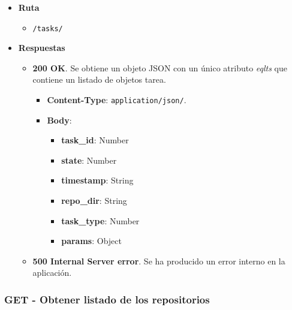 \begin{itemize}
    \item[] \textbf{Ruta}
        \begin{itemize} \setlength\itemsep{0.2em}
            \item[] \texttt{/tasks/}
        \end{itemize}
    \item[] \textbf{Respuestas}
        \begin{itemize} \setlength\itemsep{0.2em}
            \item[] \textbf{200 OK}. Se obtiene un objeto JSON con un único atributo \textit{eqlts} que contiene un listado de objetos tarea.
                \begin{itemize} \setlength\itemsep{0.2em}
                    \item[] \textbf{Content-Type}: \texttt{application/json/}.
                    \item[] \textbf{Body}: 
                        \begin{itemize}
                            \item[] \textbf{task\_id}: Number
                            \item[] \textbf{state}: Number
                            \item[] \textbf{timestamp}: String
                            \item[] \textbf{repo\_dir}: String
                            \item[] \textbf{task\_type}: Number
                            \item[] \textbf{params}: Object
                        \end{itemize}
                \end{itemize}
            \item[] \textbf{500 Internal Server error}. Se ha producido un error interno en la aplicación.
        \end{itemize}
\end{itemize}

\subsubsection{GET - Obtener listado de los repositorios}

